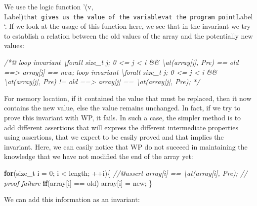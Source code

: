 \documentclass[12pt,francais,]{scrbook}
\newenvironment{Shaded}{}{}
\newcommand{\KeywordTok}[1]{\textcolor[rgb]{0.00,0.44,0.13}{\textbf{{#1}}}}
\newcommand{\DecValTok}[1]{\textcolor[rgb]{0.25,0.63,0.44}{{#1}}}
\newcommand{\CommentTok}[1]{\textcolor[rgb]{0.38,0.63,0.69}{\textit{{#1}}}}
\newcommand{\NormalTok}[1]{{#1}}
\begin{document}
We use the logic function '\at(v,
Label)\texttt{that\ gives\ us\ the\ value\ of\ the\ variable}v\texttt{at\ the\ program\ point}Label`.
If we look at the usage of this function here, we see that in the
invariant we try to establish a relation between the old values of the
array and the potentially new values:

\begin{footnotesize}\begin{Shaded}
\begin{Highlighting}[]
\CommentTok{/*@}
\CommentTok{  loop invariant \textbackslash{}forall size_t j; 0 <= j < i && \textbackslash{}at(array[j], Pre) == old }
\CommentTok{                   ==> array[j] == new;}
\CommentTok{  loop invariant \textbackslash{}forall size_t j; 0 <= j < i && \textbackslash{}at(array[j], Pre) != old }
\CommentTok{                   ==> array[j] == \textbackslash{}at(array[j], Pre);}
\CommentTok{*/}
\end{Highlighting}
\end{Shaded}\end{footnotesize}

For memory location, if it contained the value that must be replaced,
then it now contains the new value, else the value remains unchanged. In
fact, if we try to prove this invariant with WP, it fails. In such a
case, the simpler method is to add different assertions that will
express the different intermediate properties using assertions, that we
expect to be easily proved and that implies the invariant. Here, we can
easily notice that WP do not succeed in maintaining the knowledge that
we have not modified the end of the array yet:

\begin{footnotesize}\begin{Shaded}
\begin{Highlighting}[]
\KeywordTok{for}\NormalTok{(size_t i = }\DecValTok{0}\NormalTok{; i < length; ++i)\{}
    \CommentTok{//@assert array[i] == \textbackslash{}at(array[i], Pre); // proof failure}
    \KeywordTok{if}\NormalTok{(array[i] == old) array[i] = new;}
\NormalTok{\}}
\end{Highlighting}
\end{Shaded}\end{footnotesize}

We can add this information as an invariant:
\end{document}
